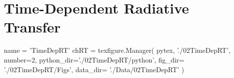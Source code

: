 \chapter{Time-Dependent Radiative Transfer}\label{Chap:TimeDepRt}
\begin{pycode}[TimeDepRT]
name = 'TimeDepRT'
chRT = texfigure.Manager(
    pytex,
    './02TimeDepRT',
    number=2,
    python_dir='./02TimeDepRT/python',
    fig_dir=   './02TimeDepRT/Figs',
    data_dir=  './Data/02TimeDepRT'
)
\end{pycode}







